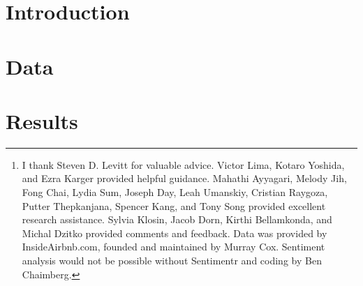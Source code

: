 \documentclass[11pt, oneside]{article}
\begin{document}
\begin{abstract}
Racial bias faced by Airbnb hosts is a topic largely underrepresented in economic literature. Earlier research has attempted to measure discrimination against New York City hosts, but was limited by a small sample size and narrow set of controls. I address this issue by using a previously unexploited dataset from a large webscrape of the Airbnb website to measure discrimination. Controlling for a large set of covariates, I estimate that black hosts earn \$5 - 7 less per night, and Asian hosts \$6 - 9 less per night (depending on the sex of the host) than white hosts who post a similar type of listing. I then explore various hypotheses for this effect. There is little evidence that these price disparities are due to minority hosts choosing to price their listings lower because of differences in their marginal cost, or offering their listing up for rent for shorter periods of time, than white hosts. I also find little evidence that this effect is due to minority hosts owning listings of worse quality. Overall, among the hypotheses I test, discrimination is the most convincing explanation for this persistent price disparity.\footnote
		{I thank Steven D. Levitt for valuable advice. Victor Lima, Kotaro Yoshida, and Ezra Karger provided helpful guidance. Mahathi Ayyagari, Melody Jih, Fong Chai, Lydia Sum, Joseph Day, Leah Umanskiy, Cristian Raygoza, Putter Thepkanjana, Spencer Kang, and Tony Song provided excellent research assistance. Sylvia Klosin, Jacob Dorn, Kirthi Bellamkonda, and Michal Dzitko provided comments and feedback. Data was provided by InsideAirbnb.com, founded and maintained by Murray Cox. Sentiment analysis would not be possible without Sentimentr and coding by Ben Chaimberg.} \end{abstract}


\doublespacing
\section{Introduction}


\section{Data}


\section{Results}

\end{document}
